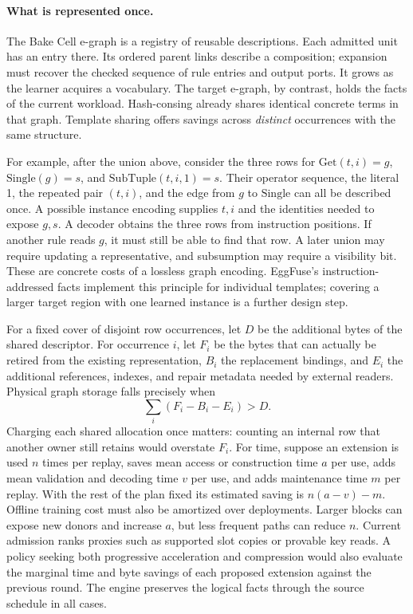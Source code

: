 \documentclass[10pt,letterpaper]{article}
\begin{document}
\paragraph{What is represented once.}
The Bake Cell e-graph is a registry of reusable descriptions. Each admitted unit has an entry there. Its ordered parent links describe a composition; expansion must recover the checked sequence of rule entries and output ports. It grows as the learner acquires a vocabulary. The target e-graph, by contrast, holds the facts of the current workload. Hash-consing already shares identical concrete terms in that graph. Template sharing offers savings across \emph{distinct} occurrences with the same structure.

For example, after the union above, consider the three rows for
\(\mathrm{Get}(t,i)=g\), \(\mathrm{Single}(g)=s\), and \(\mathrm{SubTuple}(t,i,1)=s\).
Their operator sequence, the literal 1, the repeated pair \((t,i)\), and the edge from \(g\) to \(\mathrm{Single}\) can all be described once. A possible instance encoding supplies \(t,i\) and the identities needed to expose \(g,s\). A decoder obtains the three rows from instruction positions. If another rule reads \(g\), it must still be able to find that row. A later union may require updating a representative, and subsumption may require a visibility bit. These are concrete costs of a lossless graph encoding. EggFuse's instruction-addressed facts implement this principle for individual templates; covering a larger target region with one learned instance is a further design step.

For a fixed cover of disjoint row occurrences, let \(D\) be the additional bytes of the shared descriptor. For occurrence \(i\), let \(F_i\) be the bytes that can actually be retired from the existing representation, \(B_i\) the replacement bindings, and \(E_i\) the additional references, indexes, and repair metadata needed by external readers. Physical graph storage falls precisely when
\[
                         \sum_i (F_i-B_i-E_i) > D .
\]
Charging each shared allocation once matters: counting an internal row that another owner still retains would overstate \(F_i\). For time, suppose an extension is used \(n\) times per replay, saves mean access or construction time \(a\) per use, adds mean validation and decoding time \(v\) per use, and adds maintenance time \(m\) per replay. With the rest of the plan fixed its estimated saving is \(n(a-v)-m\). Offline training cost must also be amortized over deployments. Larger blocks can expose new donors and increase \(a\), but less frequent paths can reduce \(n\). Current admission ranks proxies such as supported slot copies or provable key reads. A policy seeking both progressive acceleration and compression would also evaluate the marginal time and byte savings of each proposed extension against the previous round. The engine preserves the logical facts through the source schedule in all cases.
\end{document}
